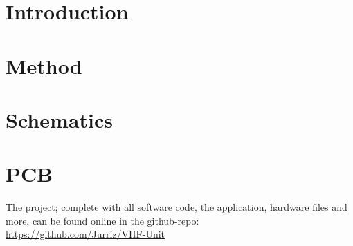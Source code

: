 \documentclass[a4paper]{article}
\begin{document}
\begin{titlepage}

\end{titlepage}

\clearpage
\begin{abstract}

\end{abstract}

\clearpage
\setlength{\columnseprule}{0.2pt}
\tableofcontents %
\vspace{0.5em}

\clearpage
\noindent
\printglossary[type=\acronymtype]
\printglossary[type=main]

\clearpage
\setcounter{page}{2}
\section{Introduction}


\clearpage
\section{Method}\label{sec:function}


\clearpage
\section{Schematics}\label{sec:schematic}


\clearpage
\section{PCB}\label{sec:pcb}


\clearpage


\clearpage
\begin{appendices}

\end{appendices}

\vspace*{9cm}
\begin{center}
The project; complete with all software code, the application, hardware files and more, can be found online in the github-repo:\\
\url{https://github.com/Jurriz/VHF-Unit}
\end{center}
\end{document}
